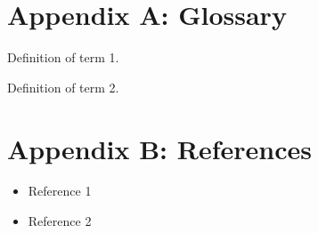 \documentclass[11pt,a4paper]{article}
\begin{document}
\appendix
\section{Appendix A: Glossary}

\begin{description}[style=nextline]
    \item[\textbf{Term 1}] Definition of term 1.
    \item[\textbf{Term 2}] Definition of term 2.
\end{description}

\section{Appendix B: References}
\begin{itemize}[noitemsep]
    \item Reference 1
    \item Reference 2
\end{itemize}
\end{document}
